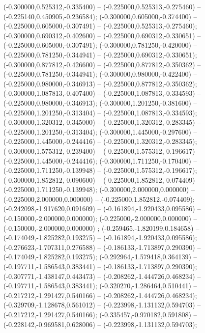 (-0.300000,0.525312,-0.335400) -- (-0.225000,0.525313,-0.275460) -- (-0.225140,0.450905,-0.236584);
 (-0.300000,0.605000,-0.374400) -- (-0.225000,0.605000,-0.307491) -- (-0.225000,0.525313,-0.275460);
 (-0.300000,0.690312,-0.402600) -- (-0.225000,0.690312,-0.330651) -- (-0.225000,0.605000,-0.307491);
 (-0.300000,0.781250,-0.420000) -- (-0.225000,0.781250,-0.344941) -- (-0.225000,0.690312,-0.330651);
 (-0.300000,0.877812,-0.426600) -- (-0.225000,0.877812,-0.350362) -- (-0.225000,0.781250,-0.344941);
 (-0.300000,0.980000,-0.422400) -- (-0.225000,0.980000,-0.346913) -- (-0.225000,0.877812,-0.350362);
 (-0.300000,1.087813,-0.407400) -- (-0.225000,1.087813,-0.334593) -- (-0.225000,0.980000,-0.346913);
 (-0.300000,1.201250,-0.381600) -- (-0.225000,1.201250,-0.313404) -- (-0.225000,1.087813,-0.334593);
 (-0.300000,1.320312,-0.345000) -- (-0.225000,1.320312,-0.283345) -- (-0.225000,1.201250,-0.313404);
 (-0.300000,1.445000,-0.297600) -- (-0.225000,1.445000,-0.244416) -- (-0.225000,1.320312,-0.283345);
 (-0.300000,1.575312,-0.239400) -- (-0.225000,1.575312,-0.196617) -- (-0.225000,1.445000,-0.244416);
 (-0.300000,1.711250,-0.170400) -- (-0.225000,1.711250,-0.139948) -- (-0.225000,1.575312,-0.196617);
 (-0.300000,1.852812,-0.090600) -- (-0.225000,1.852812,-0.074409) -- (-0.225000,1.711250,-0.139948);
 (-0.300000,2.000000,0.000000) -- (-0.225000,2.000000,0.000000) -- (-0.225000,1.852812,-0.074409);
 (-0.242098,-1.917620,0.091609) -- (-0.161894,-1.920433,0.095586) -- (-0.150000,-2.000000,0.000000);
 (-0.225000,-2.000000,0.000000) -- (-0.150000,-2.000000,0.000000) ;
 (-0.259465,-1.820199,0.184658) -- (-0.174049,-1.825282,0.193275) -- (-0.161894,-1.920433,0.095586);
 (-0.276623,-1.707311,0.276588) -- (-0.186133,-1.713897,0.290390) -- (-0.174049,-1.825282,0.193275);
 (-0.292964,-1.579418,0.364139) -- (-0.197711,-1.586543,0.383441) -- (-0.186133,-1.713897,0.290390);
 (-0.307771,-1.438147,0.443473) -- (-0.208262,-1.444726,0.468234) -- (-0.197711,-1.586543,0.383441);
 (-0.320270,-1.286464,0.510441) -- (-0.217212,-1.291427,0.540166) -- (-0.208262,-1.444726,0.468234);
 (-0.329709,-1.128678,0.561012) -- (-0.223998,-1.131132,0.594703) -- (-0.217212,-1.291427,0.540166);
 (-0.335457,-0.970182,0.591808) -- (-0.228142,-0.969581,0.628006) -- (-0.223998,-1.131132,0.594703);
